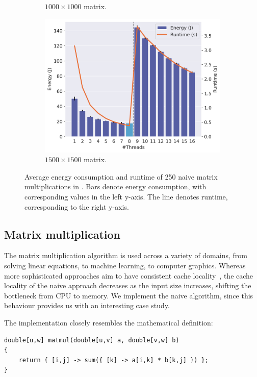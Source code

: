 \begin{figure}[!ht]
\begin{subfigure}{0.33\linewidth}
        \caption{$1000 \times 1000$ matrix.}
        \label{fig:matmul2}
    \end{subfigure}%
    \begin{subfigure}{0.33\linewidth}
        \includegraphics[width=\linewidth]{images/matmul_1500.png}
        \caption{$1500 \times 1500$ matrix.}
        \label{fig:matmul3}
    \end{subfigure}%
    \caption{Average energy consumption and runtime of 250 naive matrix multiplications in \sac{}.
    Bars denote energy consumption, with corresponding values in the left y-axis.
    The line denotes runtime, corresponding to the right y-axis.}
    \label{fig:matmul}
\end{figure}

\subsection{Matrix multiplication}

The matrix multiplication algorithm is used across a variety of domains, from solving linear
equations, to machine learning, to computer graphics. Whereas more sophisticated approaches aim to
have consistent cache locality~\cite{sac-blocking}, the cache locality of the naive approach
decreases as the input size increases, shifting the bottleneck from CPU to memory. We implement the
naive algorithm, since this behaviour provides us with an interesting case study.

The \sac{} implementation closely resembles the mathematical definition:
\begin{verbatim}
double[u,w] matmul(double[u,v] a, double[v,w] b)
{
    return { [i,j] -> sum({ [k] -> a[i,k] * b[k,j] }) };
}
\end{verbatim}

